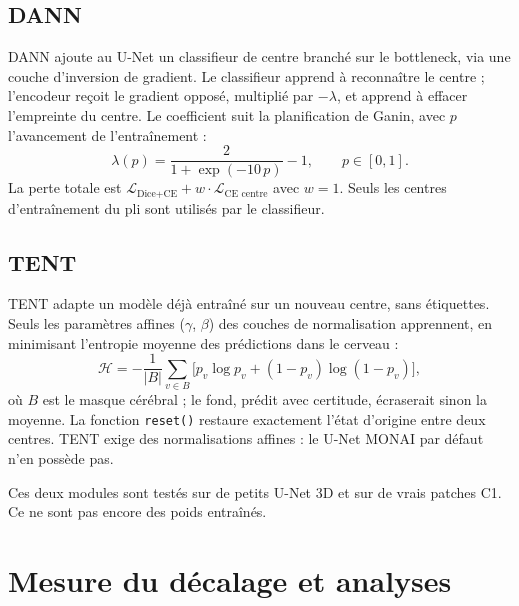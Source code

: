 \documentclass[11pt,a4paper]{report}
\newcommand{\fichier}[1]{\texttt{#1}}
\begin{document}
\subsection{DANN}

DANN ajoute au U-Net un classifieur de centre branché sur le bottleneck, via
une couche d'inversion de gradient. Le classifieur apprend à reconnaître le
centre ; l'encodeur reçoit le gradient opposé, multiplié par $-\lambda$, et
apprend à effacer l'empreinte du centre. Le coefficient suit la
planification de Ganin, avec $p$ l'avancement de l'entraînement :
\begin{equation}
  \lambda(p) = \frac{2}{1 + \exp(-10\,p)} - 1, \qquad p \in [0, 1].
\end{equation}
La perte totale est $\mathcal{L}_{\text{Dice+CE}} + w \cdot
\mathcal{L}_{\text{CE centre}}$ avec $w = 1$. Seuls les centres
d'entraînement du pli sont utilisés par le classifieur.

\subsection{TENT}

TENT adapte un modèle déjà entraîné sur un nouveau centre, sans étiquettes.
Seuls les paramètres affines ($\gamma$, $\beta$) des couches de normalisation
apprennent, en minimisant l'entropie moyenne des prédictions dans le cerveau :
\begin{equation}
  \mathcal{H} = -\frac{1}{|B|}\sum_{v \in B}
  \big[p_v \log p_v + (1-p_v)\log(1-p_v)\big],
\end{equation}
où $B$ est le masque cérébral ; le fond, prédit avec certitude, écraserait
sinon la moyenne. La fonction \fichier{reset()} restaure exactement l'état
d'origine entre deux centres. TENT exige des normalisations affines : le
U-Net MONAI par défaut n'en possède pas.

Ces deux modules sont testés sur de petits U-Net 3D et sur de vrais patches
C1. Ce ne sont pas encore des poids entraînés.

\section{Mesure du décalage et analyses}
\end{document}
